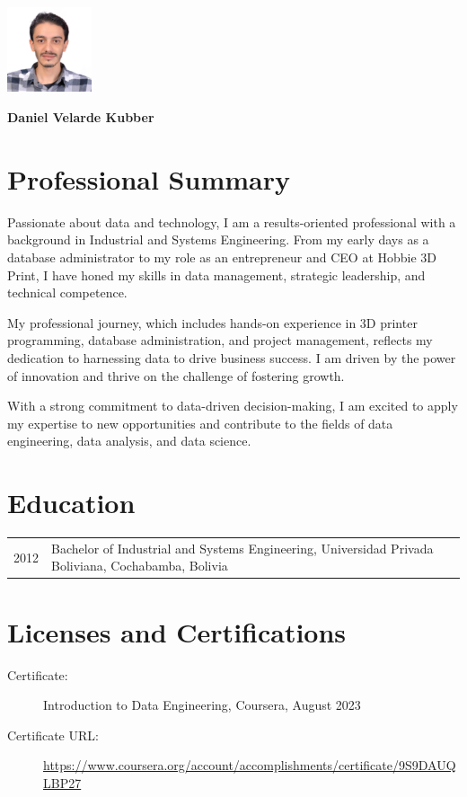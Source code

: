 \documentclass[a4paper,10pt]{article}
\begin{document}
\begin{minipage}[t]{0.7\textwidth}
\end{minipage}
\hfill
\begin{minipage}[t]{0.3\textwidth}
  \includegraphics[width=2.5cm]{photocv.jpeg}
\end{minipage}

\begin{center}
\textbf{\LARGE Daniel Velarde Kubber}
\end{center}

\section*{Professional Summary}
Passionate about data and technology, I am a results-oriented professional with a background in Industrial and Systems Engineering. From my early days as a database administrator to my role as an entrepreneur and CEO at Hobbie 3D Print, I have honed my skills in data management, strategic leadership, and technical competence.

My professional journey, which includes hands-on experience in 3D printer programming, database administration, and project management, reflects my dedication to harnessing data to drive business success. I am driven by the power of innovation and thrive on the challenge of fostering growth.

With a strong commitment to data-driven decision-making, I am excited to apply my expertise to new opportunities and contribute to the fields of data engineering, data analysis, and data science.

\section*{Education}
\begin{tabular}{p{3cm}p{12cm}}
    2012 & Bachelor of Industrial and Systems Engineering, Universidad Privada Boliviana, Cochabamba, Bolivia \\
\end{tabular}

\section*{Licenses and Certifications}
\begin{description}
    \item[Certificate:] Introduction to Data Engineering, Coursera, August 2023
    \item[Certificate URL:] \url{https://www.coursera.org/account/accomplishments/certificate/9S9DAUQLBP27}
\end{description}
\end{document}
